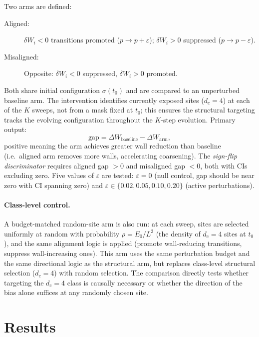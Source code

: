 \documentclass[aps,pre,preprint,superscriptaddress,showpacs]{revtex4-2}
\begin{document}
Two arms are defined:
\begin{description}
\item[Aligned:] $\delta W_i < 0$ transitions promoted
($p \to p+\varepsilon$); $\delta W_i > 0$ suppressed
($p \to p-\varepsilon$).
\item[Misaligned:] Opposite: $\delta W_i < 0$ suppressed,
$\delta W_i > 0$ promoted.
\end{description}
Both share initial configuration $\sigma(t_0)$ and are compared to an
unperturbed baseline arm.
The intervention identifies currently exposed sites ($d_c=4$) at each of the $K$ sweeps, not from a mask fixed at $t_0$; this ensures the structural targeting tracks the evolving configuration throughout the $K$-step evolution.
Primary output:
\begin{equation}
\text{gap} = \Delta W_{\text{baseline}} - \Delta W_{\text{arm}},
\end{equation}
positive meaning the arm achieves greater wall reduction than baseline
(i.e.\ aligned arm removes more walls, accelerating coarsening).
The \emph{sign-flip discriminator} requires aligned gap $>0$ and
misaligned gap $<0$, both with CIs excluding zero.
Five values of $\varepsilon$ are tested: $\varepsilon=0$ (null control,
gap should be near zero with CI spanning zero) and
$\varepsilon\in\{0.02,0.05,0.10,0.20\}$ (active perturbations).

\paragraph{Class-level control.}
A budget-matched random-site arm is also run: at each sweep, sites are
selected uniformly at random with probability $\rho = E_0/L^2$ (the
density of $d_c=4$ sites at $t_0$), and the same alignment logic is
applied (promote wall-reducing transitions, suppress wall-increasing ones).
This arm uses the same perturbation budget and the same directional logic
as the structural arm, but replaces class-level structural selection
($d_c=4$) with random selection.
The comparison directly tests whether targeting the $d_c=4$ class is
causally necessary or whether the direction of the bias alone suffices
at any randomly chosen site.

\section{Results}
\label{sec:results}
\end{document}
